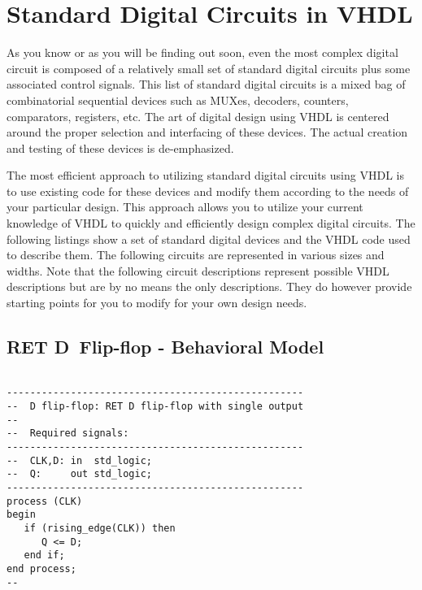 %
%
\chapter{Standard Digital Circuits in VHDL}
As you know or as you will be finding out soon, even the most complex digital circuit is composed of a relatively small set of standard digital circuits plus some associated control signals. This list of standard digital circuits is a mixed bag of combinatorial sequential devices such as MUXes, decoders, counters, comparators, registers, etc. The art of digital design using VHDL is centered around the proper selection and interfacing of these devices. The actual creation and testing of these devices is de-emphasized.

The most efficient approach to utilizing standard digital circuits using VHDL is to use existing code for these devices and modify them according to the needs of your particular design. This approach allows you to utilize your current knowledge of VHDL to quickly and efficiently design complex digital circuits. The following listings show a set of standard digital devices and the VHDL code used to describe them. The following circuits are represented in various sizes and widths. Note that the following circuit descriptions represent possible VHDL descriptions but are by no means the only descriptions. They do however provide starting points for you to modify for your own design needs.

\section{RET D~Flip-flop - Behavioral Model}

\noindent
\begin{minipage}{0.99\linewidth}
\begin{lstlisting}

---------------------------------------------------
--  D flip-flop: RET D flip-flop with single output
--
--  Required signals:
---------------------------------------------------
--  CLK,D: in  std_logic;
--  Q:     out std_logic;
---------------------------------------------------
process (CLK)
begin
   if (rising_edge(CLK)) then
      Q <= D;
   end if;
end process;
--
\end{lstlisting}
\end{minipage}

